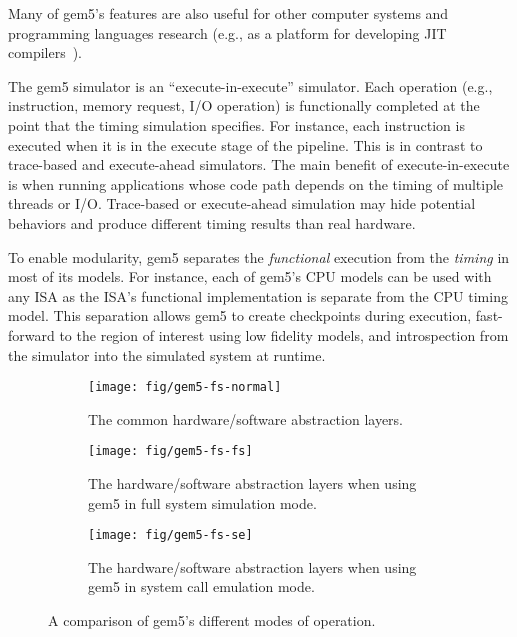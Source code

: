Many of gem5's features are also useful for other computer systems and programming languages research (e.g., as a platform for developing JIT compilers~\cite{Shingarov2015-jit}).

The gem5 simulator is an ``execute-in-execute'' simulator.
Each operation (e.g., instruction, memory request, I/O operation) is functionally completed at the point that the timing simulation specifies.
For instance, each instruction is executed when it is in the execute stage of the pipeline.
This is in contrast to trace-based and execute-ahead simulators.
The main benefit of execute-in-execute is when running applications whose code path depends on the timing of multiple threads or I/O.
Trace-based or execute-ahead simulation may hide potential behaviors and produce different timing results than real hardware.

To enable modularity, gem5 separates the \emph{functional} execution from the \emph{timing} in most of its models.
For instance, each of gem5's CPU models can be used with any ISA as the ISA's functional implementation is separate from the CPU timing model.
This separation allows gem5 to create checkpoints during execution, fast-forward to the region of interest using low fidelity models, and introspection from the simulator into the simulated system at runtime.

\begin{figure*}
  \begin{subfigure}{0.28\linewidth}
    \centering
    \texttt{[image: fig/gem5-fs-normal]}
    \caption{The common hardware/software abstraction layers.}
    \label{fig:gem5-fs-normal}
  \end{subfigure}
  \hfill
  \begin{subfigure}{0.28\linewidth}
    \centering
    \texttt{[image: fig/gem5-fs-fs]}
    \caption{The hardware/software abstraction layers when using gem5 in full system simulation mode.}
    \label{fig:gem5-fs-fs}
  \end{subfigure}
  \hfill
  \begin{subfigure}{0.28\linewidth}
    \centering
    \texttt{[image: fig/gem5-fs-se]}
    \caption{The hardware/software abstraction layers when using gem5 in system call emulation mode.}
    \label{fig:gem5-fs-se}
  \end{subfigure}
  \caption{A comparison of gem5's different modes of operation.}
  \label{fig:gem5-fs}
\end{figure*}

